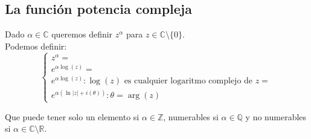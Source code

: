 \subsection{La función potencia compleja}

Dado $\alpha \in \mathbb{C}$ queremos definir $z^\alpha$ para $z \in \mathbb{C} \setminus \{0\}$.\\
Podemos definir:
\[
\begin{cases}
    z^\alpha = \\
    e^{\alpha \log(z)} = \\
    e^{\alpha \log(z)} : \log(z) \text{ es cualquier logaritmo complejo de } z = \\
    e^{\alpha (\ln|z| + i(\theta))} : \theta = \arg(z)
\end{cases}
\]

Que puede tener solo un elemento si $\alpha \in \mathbb{Z}$, numerables si $\alpha \in \mathbb{Q}$ y no numerables si $\alpha \in \mathbb{C} \setminus \mathbb{R}$.\\



